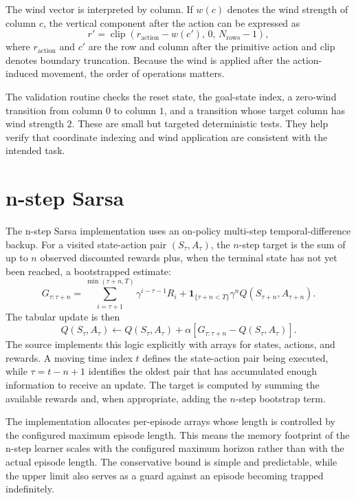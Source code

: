 \documentclass[11pt,a4paper]{article}
\begin{document}
The wind vector is interpreted by column. If $w(c)$ denotes the wind strength of column $c$, the vertical component after the action can be expressed as
\begin{equation}
r' = \operatorname{clip}\left(r_{\text{action}}-w(c'),\,0,\,N_{\text{rows}}-1\right),
\label{eq:wind}
\end{equation}
where $r_{\text{action}}$ and $c'$ are the row and column after the primitive action and clip denotes boundary truncation. Because the wind is applied after the action-induced movement, the order of operations matters.

The validation routine checks the reset state, the goal-state index, a zero-wind transition from column $0$ to column $1$, and a transition whose target column has wind strength $2$. These are small but targeted deterministic tests. They help verify that coordinate indexing and wind application are consistent with the intended task.

\section{n-step Sarsa}
The n-step Sarsa implementation uses an on-policy multi-step temporal-difference backup. For a visited state-action pair $(S_\tau,A_\tau)$, the $n$-step target is the sum of up to $n$ observed discounted rewards plus, when the terminal state has not yet been reached, a bootstrapped estimate:
\begin{equation}
G_{\tau:\tau+n}
=
\sum_{i=\tau+1}^{\min(\tau+n,T)}\gamma^{i-\tau-1}R_i
+
\mathbf{1}_{\{\tau+n<T\}}\gamma^n Q(S_{\tau+n},A_{\tau+n}).
\label{eq:nstep}
\end{equation}
The tabular update is then
\begin{equation}
Q(S_\tau,A_\tau)
\leftarrow
Q(S_\tau,A_\tau)
+
\alpha\left[G_{\tau:\tau+n}-Q(S_\tau,A_\tau)\right].
\label{eq:nstepupdate}
\end{equation}
The source implements this logic explicitly with arrays for states, actions, and rewards. A moving time index $t$ defines the state-action pair being executed, while $\tau=t-n+1$ identifies the oldest pair that has accumulated enough information to receive an update. The target is computed by summing the available rewards and, when appropriate, adding the $n$-step bootstrap term.

The implementation allocates per-episode arrays whose length is controlled by the configured maximum episode length. This means the memory footprint of the n-step learner scales with the configured maximum horizon rather than with the actual episode length. The conservative bound is simple and predictable, while the upper limit also serves as a guard against an episode becoming trapped indefinitely.
\end{document}

